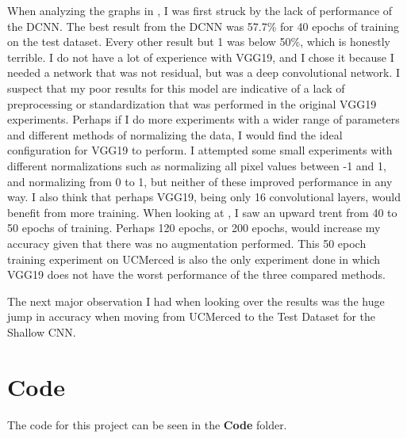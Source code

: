 \documentclass[12pt]{article}
\begin{document}
	When analyzing the graphs in , I was first struck by the lack of performance of the DCNN.  The best result from the DCNN was 57.7\% for 40 epochs of training on the test dataset. Every other result but 1 was below 50\%, which is honestly terrible. I do not have a lot of experience with VGG19, and I chose it because I needed a network that was not residual, but was a deep convolutional network. I suspect that my poor results for this model are indicative of a lack of preprocessing or standardization that was performed in the original VGG19 experiments. Perhaps if I do more experiments with a wider range of parameters and different methods of normalizing the data, I would find the ideal configuration for VGG19 to perform. I attempted some small experiments with different normalizations such as normalizing all pixel values between -1 and 1, and normalizing from 0 to 1, but neither of these improved performance in any way. I also think that perhaps VGG19, being only 16 convolutional layers, would benefit from more training. When looking at , I saw an upward trent from 40 to 50 epochs of training. Perhaps 120 epochs, or 200 epochs, would increase my accuracy given that there was no augmentation performed. This 50 epoch training experiment on UCMerced is also the only experiment done in which VGG19 does not have the worst performance of the three compared methods. 
	
	The next major observation I had when looking over the results was the huge jump in accuracy when moving from UCMerced to the Test Dataset for the Shallow CNN. 
	
	
	\section{Code}
	
	The code for this project can be seen in the \textbf{Code} folder. 
	
	
	\newpage
	 
	
\end{document}
